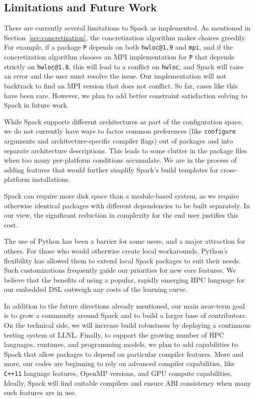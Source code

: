 
\subsection{Limitations and Future Work}

There are currently several limitations to Spack as implemented.
As mentioned in Section~\ref{sec:concretization}, the concretization
algorithm makes choices greedily. For example, if a package {\tt P} depends on 
both {\tt hwloc@1.9} and {\tt mpi}, and if the concretization algorithm
chooses an MPI implementation for {\tt P} that depends strictly on
{\tt hwloc@1.8}, this will lead to a conflict on {\tt hwloc}, and Spack
will raise an error and the user must resolve the issue.
Our implementation will not backtrack to find an MPI version
that does not conflict. So far, cases like this have been rare.
However, we plan to add better constraint satisfaction solving to
Spack in future work.

While Spack supports different architectures as part of the 
configuration space, we do not currently have ways to factor common
preferences (like {\tt configure} arguments and architecture-specific
compiler flags) out of packages and into separate architecture
descriptions.  This leads to some clutter in the package files when
too many per-platform conditions accumulate.  We are in the process
of adding features that would further simplify Spack's build templates
for cross-platform installations.

Spack can require more disk space than a module-based
system, as we require otherwise identical packages with different
dependencies to be built separately. In our view, the significant
reduction in complexity for the end user justifies this cost.

The use of Python has been a barrier for some users, and
a major attraction for others. For those who would otherwise create local
workarounds, Python's flexibility has allowed them to extend local
Spack packages to suit their needs. Such customizations frequently
guide our priorities for new core features. We believe that the
benefits of using a popular, rapidly emerging HPC language for our
embedded DSL outweigh any costs of the learning curve.

In addition to the future directions already mentioned,
our main near-term goal is to grow a community around Spack and to
build a larger base of contributors.  On the technical side, we will
increase build robustness by deploying a continuous testing system
at LLNL.  Finally, to support the growing number of
HPC languages, runtimes, and programming models, we plan to add
capabilities to Spack that allow packages to depend on particular
compiler features.  More and more, our codes are beginning to rely
on advanced compiler capabilities, like {\tt C++11} language features,
OpenMP versions, and GPU compute capabilities. Ideally, Spack
will find suitable compilers and ensure ABI consistency when many
such features are in use.
